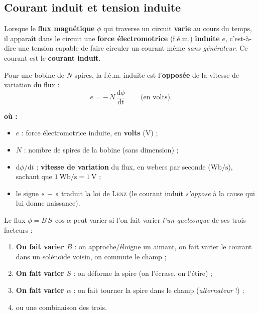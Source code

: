 \documentclass[11pt,a4paper]{article}
\newenvironment{ou}{%
  \par\smallskip\noindent\textbf{où :}\nopagebreak
  \begin{itemize}[leftmargin=1.8em,topsep=2pt,itemsep=1.5pt,parsep=0pt]}%
  {\end{itemize}}
\newcommand{\dd}{\mathrm{d}}
\begin{document}
\subsection{Courant induit et tension induite}

\begin{definition}
Lorsque le \textbf{flux magnétique} $\phi$ qui traverse un circuit \textbf{varie} au cours du temps,
il apparaît dans le circuit une \textbf{force électromotrice} (f.é.m.) \textbf{induite} $e$,
c'est-à-dire une tension capable de faire circuler un courant même \emph{sans générateur}. Ce courant
est le \textbf{courant induit}.
\end{definition}

\begin{theoreme}
Pour une bobine de $N$ spires, la f.é.m. induite est l'\textbf{opposée} de la vitesse de variation
du flux :
\[ \boxed{\,e = -\, N\, \dfrac{\dd\phi}{\dd t}\,} \qquad\text{(en volts).} \]
\begin{ou}
  \item $e$ : force électromotrice induite, en \textbf{volts} (\si{\volt}) ;
  \item $N$ : nombre de spires de la bobine (sans dimension) ;
  \item $\dd\phi/\dd t$ : \textbf{vitesse de variation} du flux, en webers par seconde
        ($\si{\weber\per\second}$), sachant que $\SI{1}{\weber\per\second}=\SI{1}{\volt}$ ;
  \item le signe « $-$ » traduit la loi de \textsc{Lenz} (le courant induit \emph{s'oppose} à la cause
        qui lui donne naissance).
\end{ou}
\end{theoreme}

\begin{methode}
Le flux $\phi=B\,S\,\cos\alpha$ peut varier si l'on fait varier \emph{l'un quelconque} de ses trois
facteurs :
\begin{enumerate}[leftmargin=1.6em,topsep=2pt,itemsep=1pt]
  \item \textbf{On fait varier $B$} : on approche/éloigne un aimant, on fait varier le courant dans
        un solénoïde voisin, on commute le champ ;
  \item \textbf{On fait varier $S$} : on déforme la spire (on l'écrase, on l'étire) ;
  \item \textbf{On fait varier $\alpha$} : on fait tourner la spire dans le champ
        (\emph{alternateur} !) ;
  \item ou une combinaison des trois.
\end{enumerate}
\end{methode}
\end{document}
